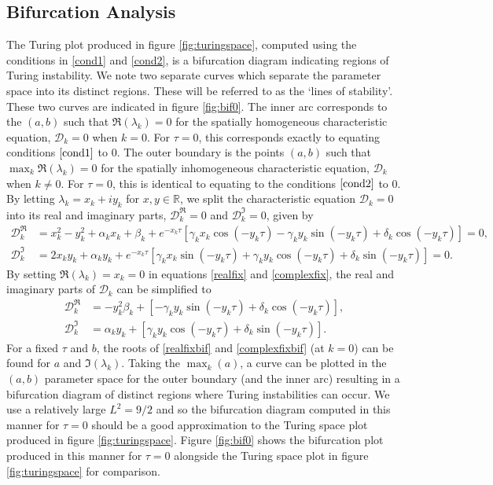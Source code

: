 \subsection{Bifurcation Analysis}\label{section:fixedbif}
The Turing plot produced in figure \ref{fig:turingspace}, computed using the conditions in \eqref{cond1} and \eqref{cond2}, is a bifurcation diagram indicating regions of Turing instability. We note two separate curves which separate the parameter space into its distinct regions. These will be referred to as the `lines of stability'.
These two curves are indicated in figure \ref{fig:bif0}. The inner arc corresponds to the $(a,b)$ such that $\Re(\lambda_k)=0$ for the
spatially homogeneous characteristic equation, $\mathcal{D}_k=0$ when $k=0$. For $\tau=0$, this corresponds exactly to equating conditions $\eqref{cond1}$ to 0. The outer boundary is the points $(a,b)$ such that $\max_k\Re(\lambda_k)=0$ for the spatially inhomogeneous characteristic equation, $\mathcal{D}_k$ when $k\neq0$. For $\tau=0$, this is identical to equating to the conditions $\eqref{cond2}$ to 0. By letting $\lambda_k=x_k+iy_k$ for $x,y\in\mathbb{R}$, we split the characteristic equation $\mathcal{D}_k=0$ into its real and imaginary parts, $\mathcal{D}_k^{\Re}=0$ and $\mathcal{D}_k^{\Im}=0$, given by
\begin{align}\label{realfix}
\mathcal{D}_k^{\Re}&=x_k^2-y_k^2+\alpha_kx_k+\beta_k+e^{-x_k\tau}[\gamma_kx_k\cos(-y_k\tau)-\gamma_ky_k\sin(-y_k\tau)+\delta_k\cos(-y_k\tau)]=0,\\
\mathcal{D}_k^{\Im}&=2x_ky_k+\alpha_ky_k+e^{-x_k\tau}[\gamma_kx_k\sin(-y_k\tau)+\gamma_ky_k\cos(-y_k\tau)+\delta_k\sin(-y_k\tau)]=0.\label{complexfix}
\end{align}
By setting $\Re(\lambda_k)=x_k=0$ in equations \eqref{realfix} and \eqref{complexfix}, the real and imaginary parts of $\mathcal{D}_k$ can be simplified to
\begin{align}\label{realfixbif}
  \mathcal{D}_k^{\Re}&=-y_k^2\beta_k+[-\gamma_ky_k\sin(-y_k\tau)+\delta_k\cos(-y_k\tau)],\\
  \mathcal{D}_k^{\Im}&=\alpha_ky_k+[\gamma_ky_k\cos(-y_k\tau)+\delta_k\sin(-y_k\tau)].\label{complexfixbif}
\end{align}
For a fixed $\tau$ and $b$, the roots of \eqref{realfixbif} and \eqref{complexfixbif} (at $k=0$) can be found for $a$ and $\Im(\lambda_k)$.
Taking the $\max_k(a)$, a curve can be plotted in the $(a,b)$ parameter space for the outer boundary (and the inner arc) resulting in a bifurcation diagram of distinct regions where Turing instabilities can occur. We use a relatively large $L^2=9/2$ and so the bifurcation diagram computed in this manner for $\tau=0$ should be a good approximation to the Turing space plot produced in figure \ref{fig:turingspace}. Figure \ref{fig:bif0} shows the bifurcation plot produced in this manner for $\tau=0$ alongside the Turing space plot in figure \ref{fig:turingspace} for comparison.

